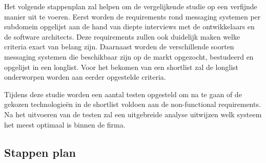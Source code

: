 



Het volgende stappenplan zal helpen om de vergelijkende studie op een verfijnde manier uit te voeren.
Eerst worden de requirements rond messaging systemen per subdomein opgelijst aan de hand van diepte interviews 
met de ontwikkelaars en de software architects. 
Deze requirements zullen ook duidelijk maken welke criteria exact van belang zijn.
Daarnaast worden de verschillende soorten messaging systemen die beschikbaar zijn op de markt opgezocht, bestudeerd en opgelijst in een longlist.
Voor het bekomen van een shortlist zal de longlist onderworpen worden aan eerder opgestelde criteria.
\newline

Tijdens deze studie worden een aantal testen opgesteld om na te gaan of de gekozen technologieën in de shortlist voldoen aan de non-functional requirements.
Na het uitvoeren van de testen zal een uitgebreide analyse uitwijzen welk systeem het meest optimaal is binnen de firma.

\subsection{Stappen plan}

